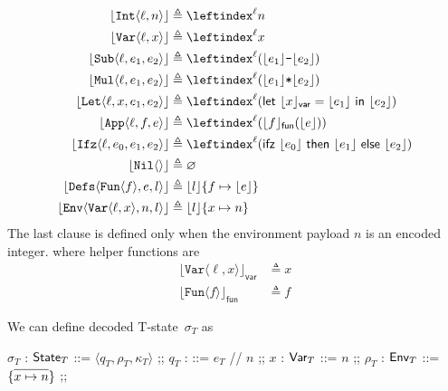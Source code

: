 \documentclass[11pt]{article}
\begin{document}
\begin{align*}
  \lfloor \texttt{Int}\langle \ell, n \rangle \rfloor &\triangleq \leftindex^{\ell}n \\
  \lfloor \texttt{Var}\langle \ell, x \rangle \rfloor &\triangleq \leftindex^{\ell}x \\
  \lfloor \texttt{Sub}\langle \ell, e_1, e_2 \rangle \rfloor &\triangleq \leftindex^{\ell}(\lfloor e_1 \rfloor \texttt{-} \lfloor e_2 \rfloor) \\
  \lfloor \texttt{Mul}\langle \ell, e_1, e_2 \rangle \rfloor &\triangleq \leftindex^{\ell}(\lfloor e_1 \rfloor \texttt{*} \lfloor e_2 \rfloor) \\
  \lfloor \texttt{Let}\langle \ell, x, e_1, e_2 \rangle \rfloor &\triangleq \leftindex^{\ell}(\mathsf{let}\ \lfloor x \rfloor_{\mathsf{var}} = \lfloor e_1 \rfloor\ \mathsf{in}\ \lfloor e_2 \rfloor) \\
  \lfloor \texttt{App}\langle \ell, f, e \rangle \rfloor &\triangleq \leftindex^{\ell}(\lfloor f \rfloor_{\mathsf{fun}}(\lfloor e \rfloor)) \\
  \lfloor \texttt{Ifz}\langle \ell, e_0, e_1, e_2 \rangle \rfloor &\triangleq \leftindex^{\ell}(\mathsf{ifz}\ \lfloor e_0 \rfloor\ \mathsf{then}\ \lfloor e_1 \rfloor\ \mathsf{else}\ \lfloor e_2 \rfloor) \\
  \lfloor \texttt{Nil}\langle\rangle \rfloor &\triangleq \varnothing \\
  \lfloor \texttt{Defs}\langle \texttt{Fun}\langle f\rangle, e, l \rangle \rfloor &\triangleq \lfloor l \rfloor\{f \mapsto \lfloor e \rfloor\} \\
  \lfloor \texttt{Env}\langle \texttt{Var}\langle \ell,x\rangle, n, l \rangle \rfloor &\triangleq \lfloor l \rfloor\{x \mapsto n\}
\end{align*}
The last clause is defined only when the environment payload \(n\) is an encoded integer.
where helper functions are
\begin{align*}
  \lfloor \texttt{Var}\langle \ell, x \rangle \rfloor_{\mathsf{var}} &\triangleq x \\
  \lfloor \texttt{Fun}\langle f \rangle \rfloor_{\mathsf{fun}} &\triangleq f
\end{align*}

We can define decoded T-state~$\sigma_T$ as
\begin{center}
\begin{bnf}
  $\sigma_T$ : $\textsf{State}_T$ ::= $\langle q_T, \rho_T, \kappa_T\rangle$
  ;;
  $q_T$ : ::= $e_T$ // $n$
  ;;
  $x$ : $\textsf{Var}_T$ ::= $n$
  ;;
  $\rho_T$ : $\textsf{Env}_T$ ::= $\{\Overline{x \mapsto n}\}$
  ;;
\end{bnf}
\end{center}
\end{document}
